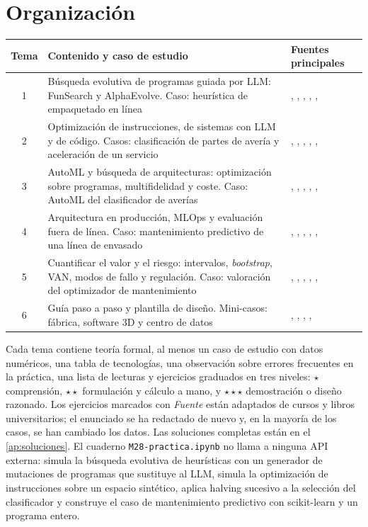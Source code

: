 \documentclass[11pt,a4paper,twoside,openany]{book}
\begin{document}
\section*{Organización}
\begin{center}\small
\begin{tabularx}{\textwidth}{@{}c>{\raggedright\arraybackslash}X>{\raggedright\arraybackslash}p{4.2cm}@{}}
\toprule
Tema & Contenido y caso de estudio & Fuentes principales \\
\midrule
1 & Búsqueda evolutiva de programas guiada por LLM: FunSearch y AlphaEvolve. Caso: heurística de empaquetado en línea & \cite{funsearch}, \cite{alphaevolve}, \cite{ae-blog}, \cite{ws}, \cite{kw}, \cite{hp} \\
2 & Optimización de instrucciones, de sistemas con LLM y de código. Casos: clasificación de partes de avería y aceleración de un servicio & \cite{opro}, \cite{dspy}, \cite{mipro}, \cite{wang-sc}, \cite{smith}, \cite{mit6172} \\
3 & AutoML y búsqueda de arquitecturas: optimización sobre programas, multifidelidad y coste. Caso: AutoML del clasificador de averías & \cite{automl}, \cite{autoweka}, \cite{elsken}, \cite{sh}, \cite{hyperband}, \cite{d2l} \\
4 & Arquitectura en producción, MLOps y evaluación fuera de línea. Caso: mantenimiento predictivo de una línea de envasado & \cite{sculley}, \cite{cs329s}, \cite{huyen}, \cite{bp}, \cite{mit1010}, \cite{dudik} \\
5 & Cuantificar el valor y el riesgo: intervalos, \emph{bootstrap}, VAN, modos de fallo y regulación. Caso: valoración del optimizador de mantenimiento & \cite{montgomery}, \cite{mit1805}, \cite{mit15401}, \cite{kohavi}, \cite{aiact}, \cite{omnibus} \\
6 & Guía paso a paso y plantilla de diseño. Mini-casos: fábrica, software 3D y centro de datos & \cite{mit16842}, \cite{cs329s}, \cite{breck}, \cite{ae-blog}, \cite{deepmind} \\
\bottomrule
\end{tabularx}
\end{center}

Cada tema contiene teoría formal, al menos un caso de estudio con datos numéricos, una tabla de tecnologías, una observación sobre errores frecuentes en la práctica, una lista de lecturas y ejercicios graduados en tres niveles: $\star$ comprensión, $\star\star$ formulación y cálculo a mano, y $\star\star\star$ demostración o diseño razonado. Los ejercicios marcados con \emph{Fuente} están adaptados de cursos y libros universitarios; el enunciado se ha redactado de nuevo y, en la mayoría de los casos, se han cambiado los datos. Las soluciones completas están en el \cref{ap:soluciones}. El cuaderno \texttt{M28-practica.ipynb} no llama a ninguna API externa: simula la búsqueda evolutiva de heurísticas con un generador de mutaciones de programas que sustituye al LLM, simula la optimización de instrucciones sobre un espacio sintético, aplica halving sucesivo a la selección del clasificador y construye el caso de mantenimiento predictivo con scikit-learn y un programa entero.
\end{document}
